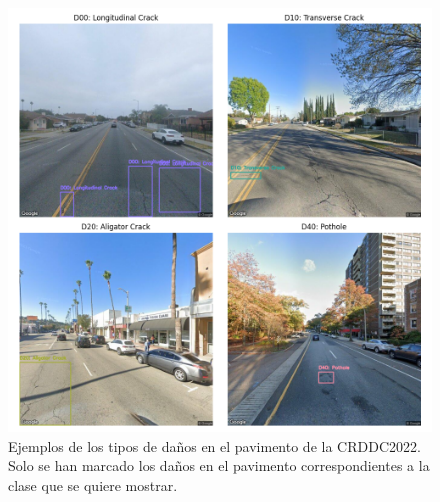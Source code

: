 \begin{figure}
    \centering
    \includegraphics[width=\textwidth,height=\textheight,keepaspectratio]{img/example_damage_types_grid.png}
    \caption{Ejemplos de los tipos de daños en el pavimento de la CRDDC2022. Solo se han marcado los daños en el pavimento correspondientes a la clase que se quiere mostrar.}
    \label{fig:example_damage_types_large}
\end{figure}

